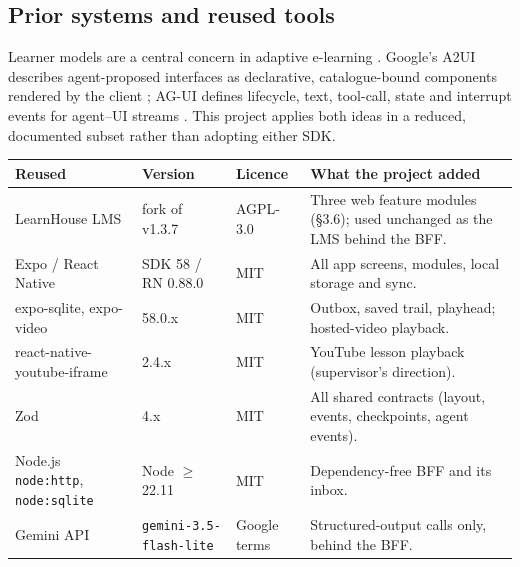 \documentclass[11pt,a4paper]{article}
\newcommand{\fp}[1]{\nolinkurl{#1}}
\begin{document}
\subsection{Prior systems and reused tools}
Learner models are a central concern in adaptive e-learning \cite{wang2025}. Google's A2UI describes
agent-proposed interfaces as declarative, catalogue-bound components rendered by the client
\cite{a2ui}; AG-UI defines lifecycle, text, tool-call, state and interrupt events for agent–UI
streams \cite{agui}. This project applies both ideas in a reduced, documented subset rather than
adopting either SDK.

\begin{xltabular}{\textwidth}{L{0.22\textwidth}L{0.17\textwidth}L{0.12\textwidth}Y}
\toprule
\textbf{Reused} & \textbf{Version} & \textbf{Licence} & \textbf{What the project added} \\
\midrule
LearnHouse LMS \cite{learnhouse} & fork of v1.3.7 & AGPL-3.0 & Three web feature modules (§3.6); used unchanged as the LMS behind the BFF. \\
Expo / React Native & SDK 58 / RN 0.88.0 & MIT & All app screens, modules, local storage and sync. \\
expo-sqlite, expo-video & 58.0.x & MIT & Outbox, saved trail, playhead; hosted-video playback. \\
react-native-youtube-iframe & 2.4.x & MIT & YouTube lesson playback (supervisor's direction). \\
Zod & 4.x & MIT & All shared contracts (layout, events, checkpoints, agent events). \\
Node.js \texttt{node:http}, \texttt{node:sqlite} & Node $\ge$ 22.11 & MIT & Dependency-free BFF and its inbox. \\
Gemini API \cite{gemini} & \fp{gemini-3.5-flash-lite} & Google terms & Structured-output calls only, behind the BFF. \\
\bottomrule
\end{xltabular}
\end{document}

